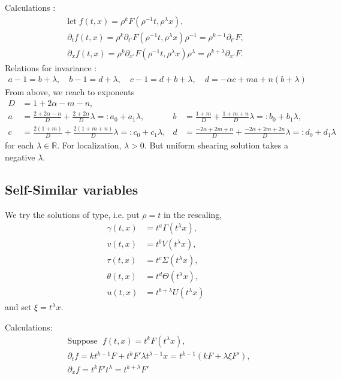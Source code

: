 \documentclass[a4paper,11pt]{article}
\begin{document}
Calculations :
\begin{align*}
 \text{let} \;f(t,x) = \rho^k F(\rho^{-1}t,\rho^\lambda x), \\
 \partial_t f(t,x) = \rho^k \partial_{t'} F(\rho^{-1}t,\rho^\lambda x) \rho^{-1} = \rho^{k-1} \partial_{t'}F, \\
 \partial_x f(t,x) = \rho^k \partial_{x'} F(\rho^{-1}t,\rho^\lambda x) \rho^\lambda = \rho^{k+\lambda} \partial_{x'}F.
\end{align*}
Relations for invariance :
\begin{align*}
 a-1 = b+\lambda, \quad b-1 = d+\lambda, \quad c-1 = d+b+\lambda, \quad d = -\alpha c + m a + n (b+\lambda)
\end{align*}
From above, we reach to exponents
\begin{align*}
 D & = 1+2\alpha-m-n,\\
 a&= \frac{2+2\alpha-n}{D} + \frac{2+2\alpha}{D}\lambda =: a_0 + a_1 \lambda, & b&=\frac{1+m}{D} + \frac{1+m+n}{D}\lambda =: b_0 + b_1\lambda,\\
 c&=\frac{2(1+m)}{D} + \frac{2(1+m+n)}{D}\lambda =: c_0 + c_1\lambda, & d&=\frac{-2\alpha + 2m +n}{D} + \frac{-2\alpha+2m+2n}{D}\lambda =: d_0 + d_1\lambda
\end{align*}
for each $\lambda \in \mathbb{R}$. For localization, $\lambda>0$. But uniform shearing solution takes a negative $\lambda$.
\subsection{Self-Similar variables}
We try the solutions of type, i.e. put $\rho =t$ in the rescaling,
\begin{align*}
 \gamma(t,x) &= t^a\Gamma(t^\lambda x),\\
 v(t,x) &= t^b V(t^\lambda x),\\
 \tau(t,x) &= t^c \Sigma(t^\lambda x),\\
 \theta(t,x) &= t^d \Theta(t^\lambda x),\\
 u(t,x) &= t^{b+\lambda} U(t^\lambda x)
\end{align*}
and set $\xi = t^\lambda x$.

Calculations:
\begin{align*}
 &\text{Suppose } \; f(t,x) = t^k F(t^\lambda x),\\
 &\partial_t f = k t^{k-1} F + t^k F' \lambda t^{\lambda-1} x = t^{k-1} (kF + \lambda\xi F'),\\
 &\partial_x f = t^k F' t^\lambda = t^{k+\lambda} F'
\end{align*}
\end{document}
